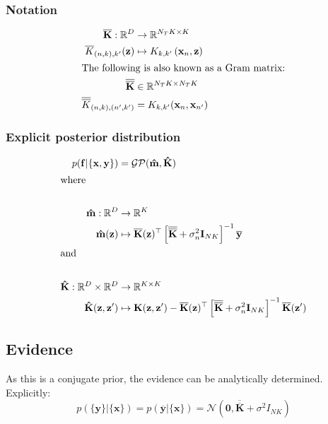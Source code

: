\documentclass[12pt,a4paper,twoside]{report}
\theoremstyle{definition}
\begin{document}
\subsubsection{Notation}\label{notation}
\begin{align*}
	\mathbf{\overline K}: \mathbb{R}^D &\to \mathbb{R}^{N_TK\times K} \\
	{\overline K}_{(n,k),k'}(\mathbf z) &\mapsto K_{k,k'}\left(\mathbf x_n, \mathbf z\right)  \\
	\intertext{The following is also known as a Gram matrix:}
	\mathbf{\overline{\overline K}}&\in \mathbb{R}^{N_TK\times N_TK}\\
	{\overline{\overline K}}_{(n,k),(n',k')}&=K_{k,k'}(\mathbf x_n, \mathbf x_{n'})\\
\end{align*}

\subsubsection{Explicit posterior distribution}
\begin{align*}
	p(\mathbf f|\{\mathbf x,\mathbf y\}) &= \mathcal {GP}(\mathbf{\hat m},\mathbf{\hat  K})\\
	\intertext{where}\\
	\mathbf{\hat  m}: \mathbb{R}^D&\to\mathbb{R}^K\\
	\mathbf{\hat  m}(\mathbf z)&\mapsto \mathbf{\overline K}(\mathbf z)^\top\left[\mathbf{\overline{\overline K}} + \sigma_n^2 \mathbf I_{NK}\right]^{-1}\mathbf{\overline y}\\
	\intertext{and}\\
	\mathbf{\hat K}: \mathbb{R}^D\times \mathbb{R}^D&\to\mathbb{R}^{K\times K}\\
	\mathbf{\hat K}(\mathbf z,\mathbf z')&\mapsto \mathbf K(\mathbf z,\mathbf z') - \mathbf{\overline K}(\mathbf z)^\top\left[\mathbf{\overline{\overline K}} + \sigma_n^2 \mathbf I_{NK}\right]^{-1} \mathbf{\overline K}(\mathbf z')
\end{align*}

\subsection{Evidence}\label{evidence}
As this is a conjugate prior, the evidence can be analytically determined. Explicitly:
$$p(\{\mathbf y\}|\{\mathbf x\}) =p(\mathbf{\overline y} |\{\mathbf x\}) = \mathcal N(\mathbf 0, \mathbf{\overline{\overline K}} + \sigma^2 I_{NK})$$
\end{document}
